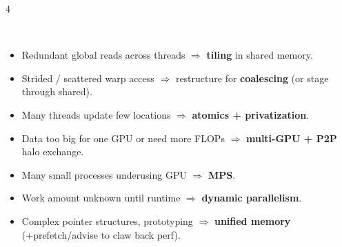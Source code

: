 \documentclass[10pt]{extarticle}
\newcommand{\sect}[1]{\vspace{3pt}\par\colorbox{hdr}{\textcolor{white}{\textbf{\small #1}}}\par\vspace{2pt}}
\begin{document}
\begin{multicols*}{4}
\sect{Which optimization when}
\begin{itemize}
\item Redundant global reads across threads $\Rightarrow$ \textbf{tiling} in shared memory.
\item Strided / scattered warp access $\Rightarrow$ restructure for \textbf{coalescing} (or stage through shared).
\item Many threads update few locations $\Rightarrow$ \textbf{atomics + privatization}.
\item Data too big for one GPU or need more FLOPs $\Rightarrow$ \textbf{multi-GPU + P2P} halo exchange.
\item Many small processes underusing GPU $\Rightarrow$ \textbf{MPS}.
\item Work amount unknown until runtime $\Rightarrow$ \textbf{dynamic parallelism}.
\item Complex pointer structures, prototyping $\Rightarrow$ \textbf{unified memory} (+prefetch/advise to claw back perf).
\end{itemize}

\end{multicols*}
\end{document}
